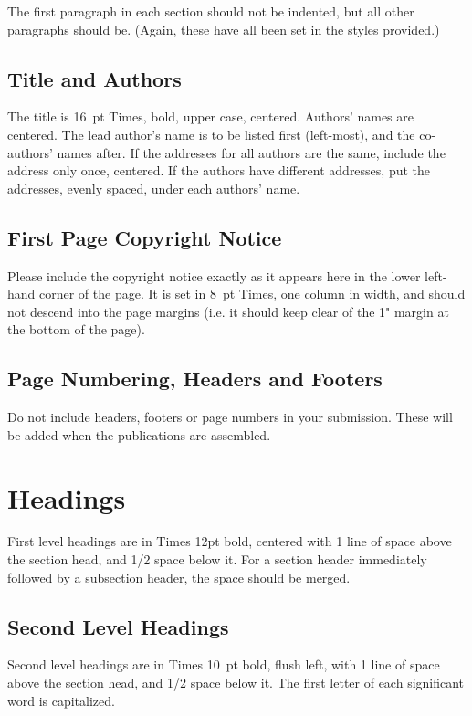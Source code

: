 \documentclass{article}
\begin{document}
The first paragraph in each section should not be indented, but all other paragraphs should be. (Again, these have all been set in the styles provided.)


\subsection{Title and Authors}
The title is 16~pt Times, bold, upper case, centered. Authors' names are centered. The lead author's name is to be listed first (left-most), and the co-authors' names after. If the addresses for all authors are the same, include the address only once, centered. If the authors have different addresses, put the addresses, evenly spaced, under each authors' name.

\subsection{First Page Copyright Notice}
Please include the copyright notice exactly as it appears here in the lower left-hand corner of the page. It is set in 8~pt Times, one column in width, and should not descend into the  page margins (i.e. it should keep clear of the 1" margin at the bottom of the page).

\subsection{Page Numbering, Headers and Footers}
Do not include headers, footers or page numbers in your submission. These will be added when the publications are assembled.

\section{Headings}
First level headings are in Times 12pt bold, centered with 1 line of space above the section head, and 1/2 space below it.  For a section header immediately followed by a subsection header, the space should be merged.

\subsection{Second Level Headings}
Second level headings are in Times 10~pt bold, flush left,
with 1 line of space above the section head, and 1/2 space below it.
The first letter of each significant word is capitalized.
\end{document}
